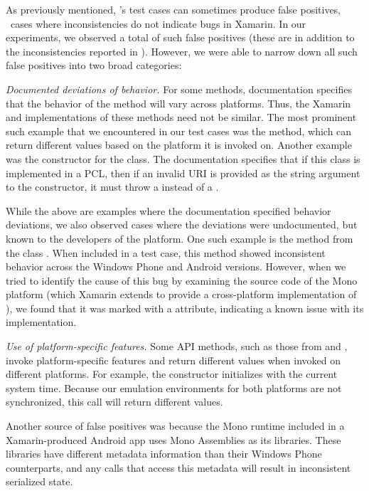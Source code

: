 %
As previously mentioned, \tool's test cases can sometimes produce false
positives, \ie~cases where inconsistencies do not indicate bugs in Xamarin.  In
our experiments, we observed a total of  such false positives
(these are in addition to the  inconsistencies reported in
).  However, we were able to narrow down all such
false positives into two broad categories:
%
\begin{mybullet}
%
\item \textit{Documented deviations of behavior.} For some methods,
documentation specifies that the behavior of the method will vary across
platforms. Thus, the Xamarin and  implementations of these methods
need not be similar. The most prominent such example that we encountered in our
test cases was the  method, which can return different
values based on the platform it is invoked on. Another example was the
constructor for the  class. The documentation specifies that
if this class is implemented in a PCL, then if an invalid URI is provided as
the string argument to the constructor, it must throw a 
instead of a .

While the above are examples where the documentation specified behavior
deviations, we also observed cases where the deviations were undocumented, but
known to the developers of the platform. One such example is the method
 from the class . When
included in a test case, this method showed inconsistent behavior across the
Windows Phone and Android versions. However, when we tried to identify the
cause of this bug by examining the source code of the Mono platform (which
Xamarin extends to provide a cross-platform implementation of ), we
found that it was marked with a  attribute, indicating a known
issue with its implementation.
%
\item \textit{Use of platform-specific features.} Some API methods, such as
those from  and , invoke
platform-specific features and return different values when invoked on
different platforms. For example, the  constructor
initializes  with the current system time. Because our
emulation environments for both platforms are not synchronized, this call will
return different values.

Another source of false positives was because the Mono runtime included in a
Xamarin-produced Android app uses Mono Assemblies as its libraries. These
libraries have different metadata information than their Windows Phone
counterparts, and any calls that access this metadata will result in
inconsistent serialized state.
%
\end{mybullet}

